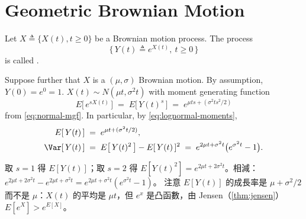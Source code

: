 \section{Geometric Brownian Motion}
\label{sec:gbm}


\begin{definition}
	Let $X\triangleq\{X(t),t\ge0\}$ be a Brownian motion process.
	The process
	\[
		\bigl\{\,Y(t)\triangleq e^{X(t)},\ t\ge0\,\bigr\}
	\]
	is called .
\end{definition}

Suppose further that $X$ is a $(\mu,\sigma)$ Brownian motion.
By assumption, $Y(0)=e^{0}=1$.
$X(t)\sim N(\mu t,\sigma^{2}t)$ with moment generating function
\[
	E\bigl[\,e^{sX(t)}\,\bigr] \;=\; E\bigl[\,Y(t)^{s}\,\bigr] \;=\; e^{\mu ts+(\sigma^{2}ts^{2}/2)}
\]
from \eqref{eq:normal-mgf}.
In particular, by \eqref{eq:lognormal-moments},
\begin{align*}
	E[\,Y(t)\,]   & \;=\; e^{\mu t+(\sigma^{2}t/2)} ,                                                                                       \\
	\Var[\,Y(t)\,] & \;=\; E\bigl[\,Y(t)^{2}\,\bigr]-E[\,Y(t)\,]^{2} \;=\; e^{2\mu t+\sigma^{2}t}\bigl(e^{\sigma^{2}t}-1\bigr) .
\end{align*}

\suppstart
{}

\begin{remark}
	取 $s=1$ 得 $E[Y(t)]$；取 $s=2$ 得 $E[Y(t)^{2}]=e^{2\mu t+2\sigma^{2}t}$。相減：$e^{2\mu t+2\sigma^{2}t}-e^{2\mu t+\sigma^{2}t}=e^{2\mu t+\sigma^{2}t}(e^{\sigma^{2}t}-1)$。
	注意 $E[Y(t)]$ 的成長率是 $\mu+\sigma^{2}/2$ 而不是 $\mu$：$X(t)$ 的平均是 $\mu t$，但 $e^{x}$ 是凸函數，由 Jensen（\autoref{thm:jensen}）$E[e^{X}]>e^{E[X]}$。
\end{remark}
\suppend

